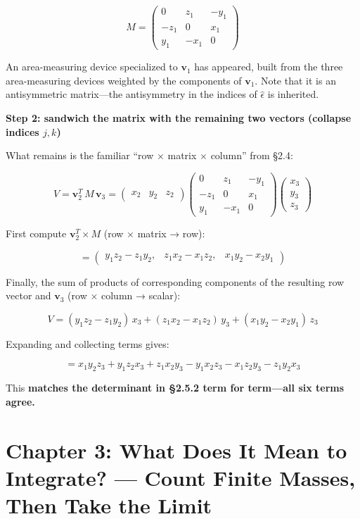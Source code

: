 \documentclass[a4paper,12pt,openany]{book}
\begin{document}
\[M = \begin{pmatrix} 0 & z_1 & -y_1 \\ -z_1 & 0 & x_1 \\ y_1 & -x_1 & 0 \end{pmatrix}\]

An area-measuring device specialized to \(\mathbf{v}_1\) has appeared,
built from the three area-measuring devices weighted by the components
of \(\mathbf{v}_1\). Note that it is an antisymmetric matrix—the
antisymmetry in the indices of \(\widehat{\epsilon}\) is inherited.

\textbf{Step 2: sandwich the matrix with the remaining two vectors
(collapse indices \(j,k\))}

What remains is the familiar ``row \(\times\) matrix \(\times\) column''
from §2.4:

\[V = \mathbf{v}_2^T\, M\, \mathbf{v}_3 = \begin{pmatrix} x_2 & y_2 & z_2 \end{pmatrix} \begin{pmatrix} 0 & z_1 & -y_1 \\ -z_1 & 0 & x_1 \\ y_1 & -x_1 & 0 \end{pmatrix} \begin{pmatrix} x_3 \\ y_3 \\ z_3 \end{pmatrix}\]

First compute \(\mathbf{v}_2^T \times M\) (row \(\times\) matrix → row):

\[= \begin{pmatrix} y_1 z_2 - z_1 y_2, & z_1 x_2 - x_1 z_2, & x_1 y_2 - x_2 y_1 \end{pmatrix}\]

Finally, the sum of products of corresponding components of the
resulting row vector and \(\mathbf{v}_3\) (row \(\times\) column →
scalar):

\[V = (y_1 z_2 - z_1 y_2)\,x_3 + (z_1 x_2 - x_1 z_2)\,y_3 + (x_1 y_2 - x_2 y_1)\,z_3\]

Expanding and collecting terms gives:

\[= x_1 y_2 z_3 + y_1 z_2 x_3 + z_1 x_2 y_3 - y_1 x_2 z_3 - x_1 z_2 y_3 - z_1 y_2 x_3\]

This \textbf{matches the determinant in §2.5.2 term for term—all six
terms agree.}

\newpage

\hypertarget{chapter-3-what-does-it-mean-to-integrate-count-finite-masses-then-take-the-limit}{%
\chapter{Chapter 3: What Does It Mean to Integrate? — Count Finite
Masses, Then Take the
Limit}\label{chapter-3-what-does-it-mean-to-integrate-count-finite-masses-then-take-the-limit}}
\end{document}
